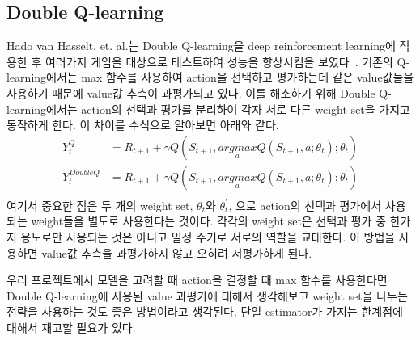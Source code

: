 \subsection{Double Q-learning}
\label{sec:survey:DoubleQ}
Hado van Hasselt, et. al.는 Double Q-learning을 deep reinforcement learning에 적용한 후 여러가지 게임을 대상으로 테스트하여 성능을 향상시킴을 보였다~\cite{DoubleQ}.
기존의 Q-learning에서는 max 함수를 사용하여 action을 선택하고 평가하는데 같은 value값들을 사용하기 때문에 value값 추측이 과평가되고 있다.
이를 해소하기 위해 Double Q-learning에서는 action의 선택과 평가를 분리하여 각자 서로 다른 weight set을 가지고 동작하게 한다.
이 차이를 수식으로 알아보면 아래와 같다.
\begin{align*}
	Y^Q_t &= R_{t+1} + \gamma Q ( S_{t+1}, \underset{a}{argmax}Q(S_{t+1},a;\theta_t);\theta_t ) \\
	Y^{DoubleQ}_t &= R_{t+1} + \gamma Q ( S_{t+1}, \underset{a}{argmax}Q(S_{t+1},a;\theta_t);\theta^{'}_t ) \\
\end{align*}
여기서 중요한 점은 두 개의 weight set, $\theta_t$와 $\theta^{'}_t$, 으로 action의 선택과 평가에서 사용되는 weight들을 별도로 사용한다는 것이다.
각각의 weight set은 선택과 평가 중 한가지 용도로만 사용되는 것은 아니고 일정 주기로 서로의 역할을 교대한다.
이 방법을 사용하면 value값 추측을 과평가하지 않고 오히려 저평가하게 된다.

우리 프로젝트에서 모델을 고려할 때 action을 결정할 때 max 함수를 사용한다면 Double Q-learning에 사용된 value 과평가에 대해서 생각해보고 weight set을 나누는 전략을 사용하는 것도 좋은 방법이라고 생각된다.
단일 estimator가 가지는 한계점에 대해서 재고할 필요가 있다.
